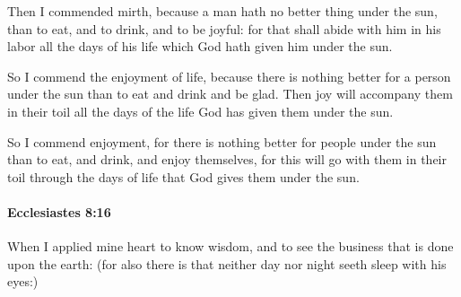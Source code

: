 			\begin{versebox}
					\item[BHS] 
					\item[LXX] 
					\item[ASV] Then I commended mirth, because a man hath no better thing under the sun, than to eat, and to drink, and to be joyful: for that shall abide with him in his labor all the days of his life which God hath given him under the sun.
					\item[NIV] So I commend the enjoyment of life, because there is nothing better for a person under the sun than to eat and drink and be glad. Then joy will accompany them in their toil all the days of the life God has given them under the sun.
					\item[NRSV] So I commend enjoyment, for there is nothing better for people under the sun than to eat, and drink, and enjoy themselves, for this will go with them in their toil through the days of life that God gives them under the sun.
			\end{versebox}

		\paragraph{Ecclesiastes 8:16} %
			\label{ECCLESIASTES-8-16}

			When I applied mine heart to know wisdom, and to see the business that is done upon the earth: (for also there is that neither day nor night seeth sleep with his eyes:)

